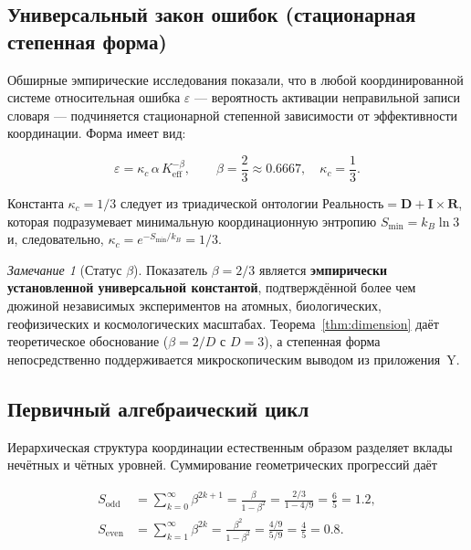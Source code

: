 \documentclass[12pt,a4paper]{article}
\theoremstyle{remark}
\newtheorem{remark}[theorem]{Замечание}
\begin{document}
	\subsection{Универсальный закон ошибок (стационарная степенная форма)}
	
	Обширные эмпирические исследования \cite{AppendixL, AppendixFerra} показали, что в любой координированной системе относительная ошибка \(\varepsilon\) --- вероятность активации неправильной записи словаря --- подчиняется стационарной степенной зависимости от эффективности координации. Форма имеет вид:
	
	\begin{equation}
		\boxed{\varepsilon = \kappa_c \, \alpha \, K_{\mathrm{eff}}^{-\beta}, \qquad
			\beta = \frac{2}{3} \approx 0.6667,\quad \kappa_c = \frac{1}{3}}.
		\label{eq:error-law-corrected}
	\end{equation}
	
	Константа \(\kappa_c = 1/3\) следует из триадической онтологии \(\text{Реальность} = \mathbf{D} + \mathbf{I} \times \mathbf{R}\), которая подразумевает минимальную координационную энтропию \(S_{\min} = k_B \ln 3\) и, следовательно, \(\kappa_c = e^{-S_{\min}/k_B} = 1/3\).
	
	\begin{remark}[Статус \(\beta\)]
		Показатель \(\beta = 2/3\) является \textbf{эмпирически установленной универсальной константой}, подтверждённой более чем дюжиной независимых экспериментов на атомных, биологических, геофизических и космологических масштабах. Теорема~\ref{thm:dimension} даёт теоретическое обоснование (\(\beta = 2/D\) с \(D=3\)), а степенная форма непосредственно поддерживается микроскопическим выводом из приложения~Y.
	\end{remark}
	
	\subsection{Первичный алгебраический цикл}
	\label{sec:algebraic-loop}
	
	Иерархическая структура координации естественным образом разделяет вклады нечётных и чётных уровней. Суммирование геометрических прогрессий даёт
	
	\begin{align}
		S_{\mathrm{odd}} &= \sum_{k=0}^{\infty} \beta^{2k+1} = \frac{\beta}{1-\beta^{2}}
		= \frac{2/3}{1 - 4/9} = \frac{6}{5} = 1.2, \label{eq:sodd}\\
		S_{\mathrm{even}} &= \sum_{k=1}^{\infty} \beta^{2k} = \frac{\beta^{2}}{1-\beta^{2}}
		= \frac{4/9}{5/9} = \frac{4}{5} = 0.8. \label{eq:seven}
	\end{align}
	
\end{document}
